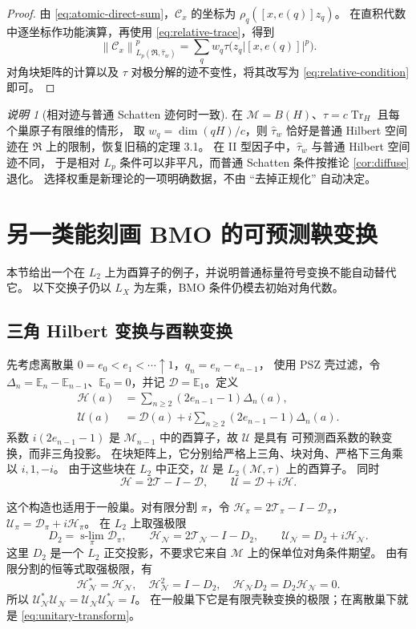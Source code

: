 \documentclass[UTF8,11pt,a4paper,fontset=fandol]{ctexart}
\theoremstyle{remark}
\newtheorem{remark}[theorem]{说明}
\numberwithin{equation}{section}
\newcommand{\M}{\mathcal M}
\newcommand{\N}{\mathcal N}
\newcommand{\T}{\mathcal T}
\newcommand{\D}{\mathcal D}
\newcommand{\CC}{\mathcal C}
\newcommand{\E}{\mathbb E}
\newcommand{\Tr}{\operatorname{Tr}}
\newcommand{\norm}[1]{\left\lVert #1\right\rVert}
\begin{document}
\begin{proof}
由 \eqref{eq:atomic-direct-sum}，$\CC_x$ 的坐标为
$\rho_q([x,e(q)]z_q)$。
在直积代数中逐坐标作功能演算，再使用 \eqref{eq:relative-trace}，得到
\[
 \norm{\CC_x}_{L_p(\mathfrak R,\widehat\tau_w)}^p
 =\sum_qw_q\tau\bigl(z_q|[x,e(q)]|^p\bigr).
\]
对角块矩阵的计算以及 $\tau$ 对极分解的迹不变性，将其改写为
\eqref{eq:relative-condition} 即可。
\end{proof}

\begin{remark}[相对迹与普通 Schatten 迹何时一致]
在 $\M=B(H)$、$\tau=c\Tr_H$ 且每个巢原子有限维的情形，
取 $w_q=\dim(qH)/c$，则 $\widehat\tau_w$ 恰好是普通 Hilbert 空间迹在
$\mathfrak R$ 上的限制，恢复旧稿的定理 3.1。
在 II 型因子中，$\widehat\tau_w$ 与普通 Hilbert 空间迹不同，
于是相对 $L_p$ 条件可以非平凡，而普通 Schatten 条件按推论 \ref{cor:diffuse} 退化。
选择权重是新理论的一项明确数据，不由 ``去掉正规化'' 自动决定。
\end{remark}

\section{另一类能刻画 BMO 的可预测鞅变换}\label{sec:unitary-transform}

本节给出一个在 $L_2$ 上为酉算子的例子，并说明普通标量符号变换不能自动替代它。
以下交换子仍以 $L_X$ 为左乘，BMO 条件仍模去初始对角代数。

\subsection{三角 Hilbert 变换与酉鞅变换}

先考虑离散巢 $0=e_0<e_1<\cdots\uparrow1$，$q_n=e_n-e_{n-1}$，
使用 PSZ 壳过滤，令 $\Delta_n=\E_n-\E_{n-1}$、$\E_0=0$，并记
$\D=\E_1$。定义
\begin{align}
 \mathcal H(a)
 &=\sum_{n\geq2}(2e_{n-1}-1)\Delta_n(a),\label{eq:hilbert-transform}\\
 \mathcal U(a)
 &=\D(a)+i\sum_{n\geq2}(2e_{n-1}-1)\Delta_n(a).
       \label{eq:unitary-transform}
\end{align}
系数 $i(2e_{n-1}-1)$ 是 $\M_{n-1}$ 中的酉算子，故 $\mathcal U$ 是具有
可预测酉系数的鞅变换，而非三角投影。
在块矩阵上，它分别给严格上三角、块对角、严格下三角乘以 $i,1,-i$。
由于这些块在 $L_2$ 中正交，$\mathcal U$ 是 $L_2(\M,\tau)$ 上的酉算子。
同时
\[
 \mathcal H=2\T-I-\D,\qquad \mathcal U=\D+i\mathcal H.
\]

这个构造也适用于一般巢。对有限分割 $\pi$，令
$\mathcal H_\pi=2\T_\pi-I-\D_\pi$，
$\mathcal U_\pi=\D_\pi+i\mathcal H_\pi$。
在 $L_2$ 上取强极限
\[
 D_2=\operatorname*{s-lim}_\pi\D_\pi,\qquad
 \mathcal H_\N=2\T_\N-I-D_2,\qquad
 \mathcal U_\N=D_2+i\mathcal H_\N.
\]
这里 $D_2$ 是一个 $L_2$ 正交投影，不要求它来自 $\M$ 上的保单位对角条件期望。
由有限分割的恒等式取强极限，有
\[
 \mathcal H_\N^*=\mathcal H_\N,\quad
 \mathcal H_\N^2=I-D_2,\quad
 \mathcal H_\N D_2=D_2\mathcal H_\N=0.
\]
所以 $\mathcal U_\N^*\mathcal U_\N=\mathcal U_\N\mathcal U_\N^*=I$。
在一般巢下它是有限壳鞅变换的极限；在离散巢下就是 \eqref{eq:unitary-transform}。
\end{document}

